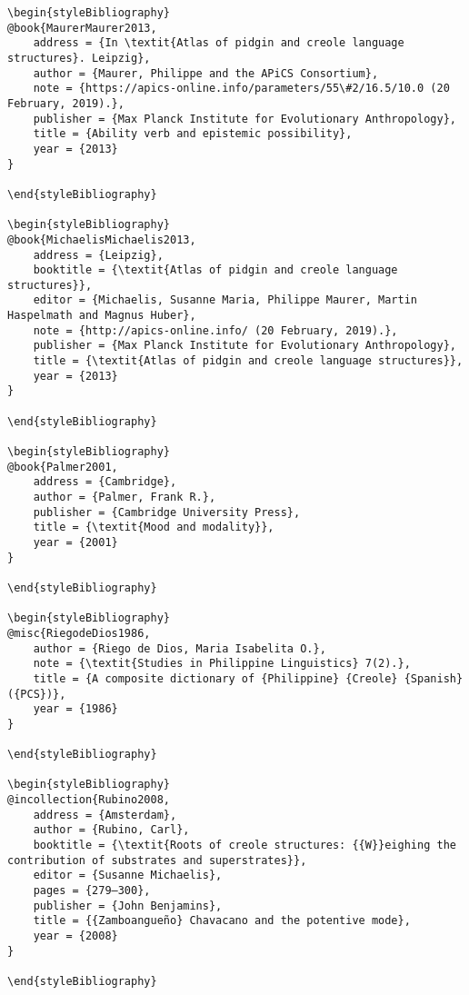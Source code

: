 \begin{stylelsUnNumberedSection}
\begin{verbatim}
\begin{styleBibliography}
@book{MaurerMaurer2013,
	address = {In \textit{Atlas of pidgin and creole language structures}. Leipzig},
	author = {Maurer, Philippe and the APiCS Consortium},
	note = {https://apics-online.info/parameters/55\#2/16.5/10.0 (20 February, 2019).},
	publisher = {Max Planck Institute for Evolutionary Anthropology},
	title = {Ability verb and epistemic possibility},
	year = {2013}
}

\end{styleBibliography}

\begin{styleBibliography}
@book{MichaelisMichaelis2013,
	address = {Leipzig},
	booktitle = {\textit{Atlas of pidgin and creole language structures}},
	editor = {Michaelis, Susanne Maria, Philippe Maurer, Martin Haspelmath and Magnus Huber},
	note = {http://apics-online.info/ (20 February, 2019).},
	publisher = {Max Planck Institute for Evolutionary Anthropology},
	title = {\textit{Atlas of pidgin and creole language structures}},
	year = {2013}
}

\end{styleBibliography}

\begin{styleBibliography}
@book{Palmer2001,
	address = {Cambridge},
	author = {Palmer, Frank R.},
	publisher = {Cambridge University Press},
	title = {\textit{Mood and modality}},
	year = {2001}
}

\end{styleBibliography}

\begin{styleBibliography}
@misc{RiegodeDios1986,
	author = {Riego de Dios, Maria Isabelita O.},
	note = {\textit{Studies in Philippine Linguistics} 7(2).},
	title = {A composite dictionary of {Philippine} {Creole} {Spanish} ({PCS})},
	year = {1986}
}

\end{styleBibliography}

\begin{styleBibliography}
@incollection{Rubino2008,
	address = {Amsterdam},
	author = {Rubino, Carl},
	booktitle = {\textit{Roots of creole structures: {{W}}eighing the contribution of substrates and superstrates}},
	editor = {Susanne Michaelis},
	pages = {279–300},
	publisher = {John Benjamins},
	title = {{Zamboangueño} Chavacano and the potentive mode},
	year = {2008}
}

\end{styleBibliography}


\end{verbatim}
\end{stylelsUnNumberedSection}
